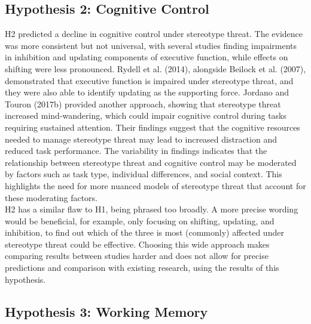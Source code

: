 \documentclass[
  stu, a4paper,floatsintext]{apa7}
\begin{document}
\subsection{Hypothesis 2: Cognitive Control}\label{hypothesis-2-cognitive-control}

H2 predicted a decline in cognitive control under stereotype threat.
The evidence was more consistent but not universal, with several studies finding impairments in inhibition and updating components of executive function, while effects on shifting were less pronounced.
Rydell et al. (2014), alongside Beilock et al. (2007), demonstrated that executive function is impaired under stereotype threat, and they were also able to identify updating as the supporting force.
Jordano and Touron (2017b) provided another approach, showing that stereotype threat increased mind-wandering, which could impair cognitive control during tasks requiring sustained attention.
Their findings suggest that the cognitive resources needed to manage stereotype threat may lead to increased distraction and reduced task performance.
The variability in findings indicates that the relationship between stereotype threat and cognitive control may be moderated by factors such as task type, individual differences, and social context.
This highlights the need for more nuanced models of stereotype threat that account for these moderating factors.\\
H2 has a similar flaw to H1, being phrased too broadly. A more precise wording would be beneficial, for example, only focusing on shifting, updating, and inhibition, to find out which of the three is most (commonly) affected under stereotype threat could be effective.
Choosing this wide approach makes comparing results between studies harder and does not allow for precise predictions and comparison with existing research, using the results of this hypothesis.

\subsection{Hypothesis 3: Working Memory}\label{hypothesis-3-working-memory}
\end{document}

